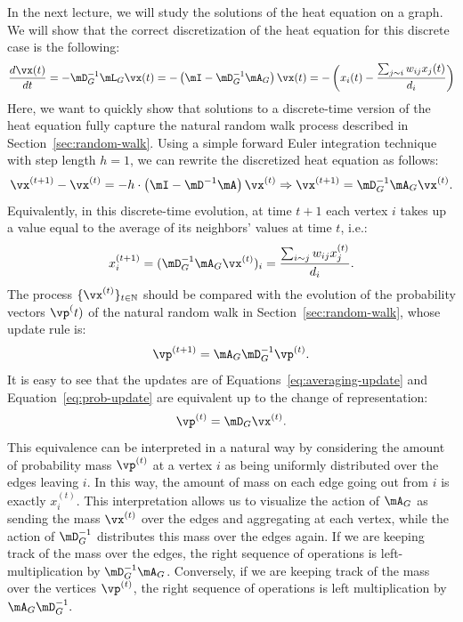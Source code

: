 In the next lecture, we will study the solutions of the heat equation on a graph. We will show that the correct discretization of the heat equation for this discrete case is the following:
$$
\frac{d\vx(t)}{dt} = - \mD^{-1}_G\mL_G \vx(t) = -\left(\mI - \mD_G^{-1} \mA_G\right) \vx(t) = -\left(x_i(t) - \frac{\sum_{j \sim i} w_{ij} x_j(t)}{d_i}\right)
$$
Here, we want to quickly show that solutions to a discrete-time version of the heat equation fully capture the natural random walk process described in Section~\ref{sec:random-walk}.
%
Using a simple forward Euler integration technique with step length $h=1$, 
we can rewrite the discretized heat equation as follows:
\begin{equation} \label{eq:averaging-update}
\vx^{(t + 1)} - \vx^{(t)} = - h \cdot \left(\mI - \mD^{-1} \mA\right) \vx^{(t)} \Rightarrow \vx^{(t + 1)} = \mD_G^{-1} \mA_G \vx^{(t)}.
\end{equation}
Equivalently, in this discrete-time evolution, at time $t+1$ each vertex $i$ takes up a value equal to the average of its neighbors' values at time $t$, i.e.:
$$
x^{(t+1)}_i =  (\mD_G^{-1} \mA_G \vx^{(t)})_i = \frac{\sum_{i \sim j} w_{ij} x^{(t)}_j}{d_i}.
$$
%
The process $\{\vx^{(t)}\}_{t \in \mathbb{N}}$ should be compared with the evolution of the probability vectors $\vp^(t)$ of the natural random walk in Section~\ref{sec:random-walk}, whose update rule is:
\begin{equation} \label{eq:prob-update}
\vp^{(t+1)} = \mA_G \mD_G^{-1} \vp^{(t)}.
\end{equation}
It is easy to see that the updates are of Equations~\ref{eq:averaging-update} and Equation~\ref{eq:prob-update} are equivalent up to the change of representation:
$$
\vp^{(t)} = \mD_G \vx^{(t)}.
$$
This equivalence can be interpreted in a natural way by considering the amount of probability mass $\vp^{(t)}$ at a vertex $i$ as being uniformly distributed over the edges leaving $i$. In this way, the amount of mass on each edge going out from $i$ is exactly $x^{(t)}_i$. This interpretation allows us to visualize the action of $\mA_G$ as sending the mass $\vx^{(t)}$ over the edges and aggregating at each vertex, while the action of $\mD_G^{-1}$ distributes this mass over the edges again. If we are keeping track of the mass over the edges, the right sequence of operations is left-multiplication by $\mD_G^{-1} \mA_G$. Conversely, if we are keeping track of the mass over the vertices $\vp^{(t)}$, the right sequence of operations is left multiplication by $\mA_G \mD_G^{-1}.$ 

